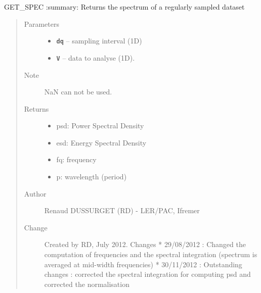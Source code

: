 \documentclass[letterpaper,10pt,english]{sphinxmanual}
\begin{document}
\begin{fulllineitems}
\label{altimetry.tools.spectrum:altimetry.tools.spectrum.get_spec}
GET\_SPEC
:summary: Returns the spectrum of a regularly sampled dataset
\begin{quote}\begin{description}
\item[{Parameters}] \leavevmode\begin{itemize}
\item {} 
\textbf{\texttt{dq}} -- sampling interval (1D)

\item {} 
\textbf{\texttt{V}} -- data to analyse (1D).

\end{itemize}

\item[{Note}] \leavevmode
NaN can not be used.

\item[{Returns}] \leavevmode
\begin{itemize}
\item {} 
psd: Power Spectral Density

\item {} 
esd: Energy Spectral Density

\item {} 
fq: frequency

\item {} 
p: wavelength (period)

\end{itemize}


\item[{Author}] \leavevmode
Renaud DUSSURGET (RD) - LER/PAC, Ifremer

\item[{Change}] \leavevmode
Created by RD, July 2012. Changes
* 29/08/2012 : Changed the computation of frequencies and the spectral integration (spectrum is averaged at mid-width frequencies)
* 30/11/2012 : Outstanding changes : corrected the spectral integration for computing psd and corrected the normalisation

\end{description}\end{quote}

\end{fulllineitems}

\end{document}
